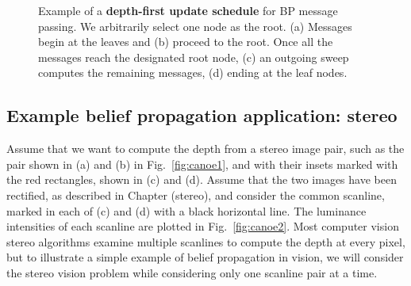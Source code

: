 \begin{figure}
\centerline{
}
\caption{Example of a {\bf depth-first update schedule} for BP
  message passing.  We arbitrarily select one node as the root.
(a) Messages begin at the leaves and (b) proceed to the root.  Once
all the messages reach the designated root node, (c) an outgoing sweep
computes the remaining messages, (d) ending at the leaf nodes.}
\label{fig:men2}
\end{figure}

\subsection{Example belief propagation application: stereo}

Assume that we want to compute the depth from a stereo image pair, such as the pair shown in (a) and (b) in Fig.~\ref{fig:canoe1}, and with their insets marked with the red rectangles, shown in (c) and (d).   Assume that the two images have been rectified, as described in Chapter (stereo), and consider the common scanline, marked in each of (c) and (d) with a black horizontal line.  The luminance intensities of each scanline are plotted in Fig.~\ref{fig:canoe2}.  Most computer vision stereo algorithms \cite{Scharstein2002} examine multiple scanlines to compute the depth at every pixel, but to illustrate a simple example of belief propagation in vision, we will consider the stereo vision problem while considering only one scanline pair at a time.

